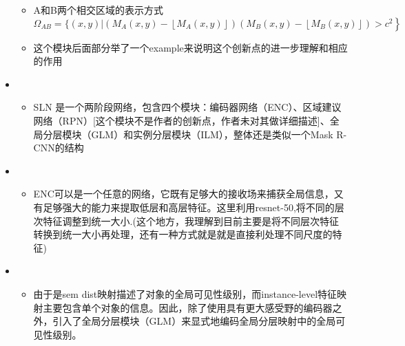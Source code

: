 \begin{itemize}[leftmargin=*]
{\begin{itemize}
\begin{equation}
\begin{array}{ll}
		\left\lfloor M_{A}(x, y)\right\rfloor-\left\lfloor M_{B}(x, y)\right\rfloor, & (x, y) \in \Omega_{A B} \\
		0, &  { otherwise }
		\end{array}\right.\end{equation}
		\item A和B两个相交区域的表示方式
		\begin{equation}
		\Omega_{A B}=\{(x, y) |\left(M_{A}(x, y)-\left\lfloor M_{A}(x, y)\right\rfloor\right) \left.\left(M_{B}(x, y)-\left\lfloor M_{B}(x, y)\right\rfloor\right)>c^{2}\right\}
		\end{equation}
		\item 这个模块后面部分举了一个example来说明这个创新点的进一步理解和相应的作用
      \end{itemize}
      
      }
  
    \item
    {\small
    \begin{itemize}
      \item SLN 是一个两阶段网络，包含四个模块：编码器网络（ENC）、区域建议网络（RPN）[这个模块不是作者的创新点，作者未对其做详细描述]、全局分层模块（GLM）和实例分层模块（ILM），整体还是类似一个Mask R-CNN的结构
    \end{itemize}
    }
    \item
    {\small
    \begin{itemize}
      \item ENC可以是一个任意的网络，它既有足够大的接收场来捕获全局信息，又有足够强大的能力来提取低层和高层特征。这里利用resnet-50,将不同的层次特征调整到统一大小.(这个地方，我理解到目前主要是将不同层次特征转换到统一大小再处理，还有一种方式就是就是直接利处理不同尺度的特征)

    \end{itemize}
    }
    \item {}
    {\small
    \begin{itemize}
      \item 由于是sem dist映射描述了对象的全局可见性级别，而instance-level特征映射主要包含单个对象的信息。因此，除了使用具有更大感受野的编码器之外，引入了全局分层模块（GLM）来显式地编码全局分层映射中的全局可见性级别。
  

\end{itemize}}
\end{itemize}
